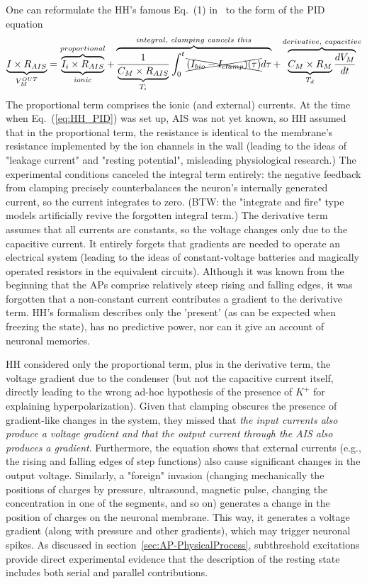 One can reformulate the \gls{HH}'s famous Eq.~(1) in~\cite{HodgkinHuxley:1952} to the form of the \gls{PID} equation
\begin{equation}
	\underbrace{I \times R_{AIS}}_{V_M^{OUT}} = 
	\overbrace{\underbrace{I_i\times  R_{AIS} }_{ionic}}^{proportional}
	+\overbrace{
		\frac{1}{\underbrace{C_M\times R_{AIS}}_{T_i}} \int_0^t \xcancel{(I_{bio}-I_{clamp})(\tau)} d\tau
	}^{integral,\ clamping\ cancels\ this}
	+\overbrace{\underbrace{C_M\times R_{M}}_{T_d}\frac{dV_M}{dt}}^{derivative,\ capacitive}
	\label{eq:HH_PID}
\end{equation}
The proportional term comprises the ionic (and external) currents.
At the time when Eq.~(\ref{eq:HH_PID}) was set up, \gls{AIS} was not yet known,
so \gls{HH} assumed that in the proportional term, the resistance is identical to the membrane's resistance implemented by the ion channels in the wall (leading to the ideas of "leakage current" and "resting potential", misleading physiological research.)
The experimental conditions canceled the integral term entirely: the negative feedback from clamping precisely counterbalances the neuron's internally generated current, so the current integrates to zero.
(BTW: the "integrate and fire" type models artificially revive the forgotten
integral term.)
The derivative term assumes that all currents are constants,
so the voltage changes only due to the capacitive current.
It entirely forgets that gradients are needed to operate an
electrical system (leading to the ideas of constant-voltage batteries
and magically operated resistors in the equivalent circuits). 
Although it was known from the beginning that the \gls{AP}s comprise relatively steep rising and falling edges, it was forgotten that a non-constant current contributes a gradient to the derivative term.
\gls{HH}'s formalism describes only the 'present' (as can be expected
when freezing the state), has no predictive power, nor can it give an account of neuronal memories.


\gls{HH} considered only the proportional term, plus in the derivative term, the voltage gradient due to the condenser (but not the capacitive current itself, directly leading to the wrong ad-hoc hypothesis of the presence of $K^+$ for explaining hyperpolarization). Given that clamping obscures the presence of
gradient-like changes in the system, they missed that \textit{the input currents also produce a voltage gradient and that the output current through the \gls{AIS} also produces a gradient}. Furthermore, the equation shows that external currents (e.g., the rising and falling edges of step functions) also cause significant changes in the output voltage.
Similarly, a "foreign" invasion (changing mechanically the positions of charges by pressure, ultrasound, magnetic pulse, changing the concentration in one of the segments, and so on) generates a change in the position of charges on the neuronal membrane. This way, it generates a voltage gradient (along with pressure and other gradients), which may trigger neuronal spikes.
As discussed in section~\ref{sec:AP-PhysicalProcess},
subthreshold excitations provide direct experimental evidence that the description of the resting state includes both serial and parallel contributions.



